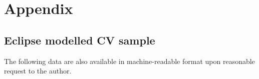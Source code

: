 
\chapter{Appendix}
\label{app:my_appendix}


\onecolumn




\section{Eclipse modelled CV sample}
\label{appendix:eclipse modelled CV data tables}

The following data are also available in machine-readable format upon reasonable request to the author.

